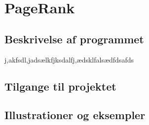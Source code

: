
\section{PageRank}

\subsection*{Beskrivelse af programmet}
j,akfsdl,jadsælkfjksdalfj,ædsklfalsædfdsafds

\subsection*{Tilgange til projektet}

\subsection*{Illustrationer og eksempler}